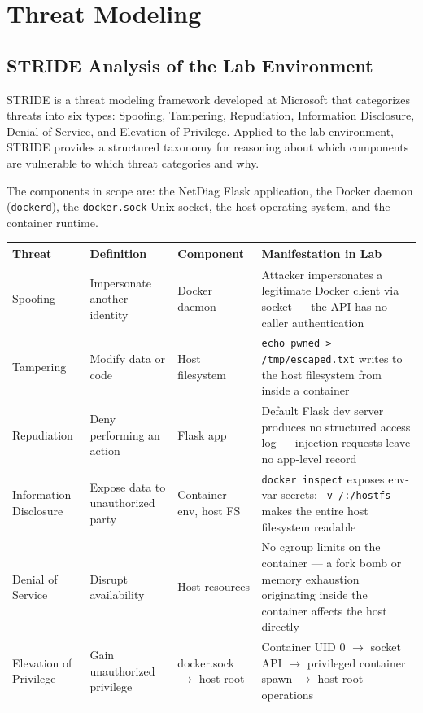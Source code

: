 \chapter{Threat Modeling}

\section{STRIDE Analysis of the Lab Environment}

STRIDE is a threat modeling framework developed at Microsoft that categorizes threats into six types: Spoofing, Tampering, Repudiation, Information Disclosure, Denial of Service, and Elevation of Privilege. Applied to the lab environment, STRIDE provides a structured taxonomy for reasoning about which components are vulnerable to which threat categories and why.

The components in scope are: the NetDiag Flask application, the Docker daemon (\texttt{dockerd}), the \texttt{docker.sock} Unix socket, the host operating system, and the container runtime.

\begin{center}
\begin{tabular}{p{1.8cm}p{3cm}p{2.5cm}p{5.5cm}}
\hline
\textbf{Threat} & \textbf{Definition} & \textbf{Component} & \textbf{Manifestation in Lab} \\
\hline
Spoofing & Impersonate another identity & Docker daemon & Attacker impersonates a legitimate Docker client via socket --- the API has no caller authentication \\
Tampering & Modify data or code & Host filesystem & \texttt{echo pwned > /tmp/escaped.txt} writes to the host filesystem from inside a container \\
Repudiation & Deny performing an action & Flask app & Default Flask dev server produces no structured access log --- injection requests leave no app-level record \\
Information Disclosure & Expose data to unauthorized party & Container env, host FS & \texttt{docker inspect} exposes env-var secrets; \texttt{-v /:/hostfs} makes the entire host filesystem readable \\
Denial of Service & Disrupt availability & Host resources & No cgroup limits on the container --- a fork bomb or memory exhaustion originating inside the container affects the host directly \\
Elevation of Privilege & Gain unauthorized privilege & docker.sock $\rightarrow$ host root & Container UID 0 $\rightarrow$ socket API $\rightarrow$ privileged container spawn $\rightarrow$ host root operations \\
\hline
\end{tabular}
\end{center}

